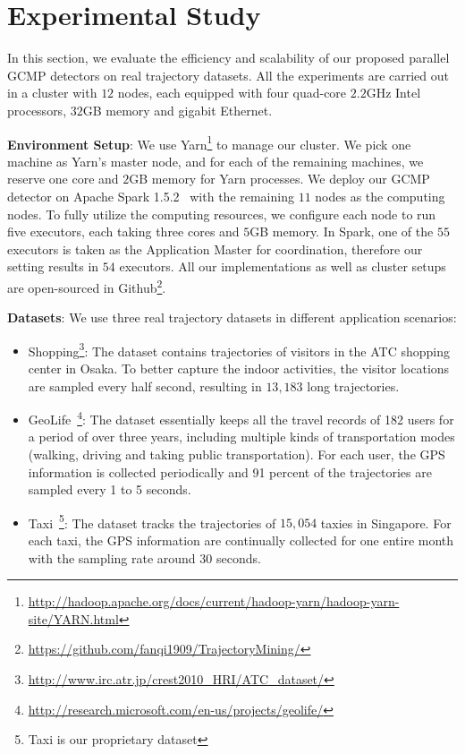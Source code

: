 \section{Experimental Study}
\label{sec:exp}
In this section, we evaluate the efficiency and scalability of our proposed parallel GCMP detectors on real trajectory datasets. All the experiments are carried out in a cluster with $12$ nodes, each equipped with four quad-core $2.2$GHz Intel processors, $32$GB memory and gigabit Ethernet. 

\textbf{Environment Setup}: We use Yarn\footnote{\url{http://hadoop.apache.org/docs/current/hadoop-yarn/hadoop-yarn-site/YARN.html}} to manage our cluster. We pick one machine as Yarn's master node, and for each of the remaining machines, we reserve one core and $2$GB memory for Yarn processes. We deploy our GCMP detector on Apache Spark 1.5.2~\cite{zaharia2012resilient} with the remaining $11$ nodes as the computing nodes.
To fully utilize the computing resources, we configure each node to run five executors, each taking three cores and $5$GB memory. In Spark, one of the $55$ executors is taken as the Application Master for coordination, therefore our setting results in $54$ executors. 
All our implementations as well as cluster setups are open-sourced in Github\footnote{\url{https://github.com/fanqi1909/TrajectoryMining/}}.

\textbf{Datasets}: We use three real trajectory datasets in different application scenarios:
\begin{itemize}
\item{Shopping}\footnote{\url{http://www.irc.atr.jp/crest2010_HRI/ATC_dataset/}}: The dataset contains
  trajectories of visitors in the ATC shopping center in Osaka. To better capture the indoor activities, the visitor locations are sampled every half second, resulting in $13,183$ long trajectories. 
\item{GeoLife}~\footnote{\url{http://research.microsoft.com/en-us/projects/geolife/}}: The dataset essentially keeps all the travel records of 182 users for a period
of over three years, including multiple kinds of transportation modes (walking, driving and taking public
transportation). For each user, the GPS information is collected periodically and 91 percent of the trajectories
are sampled every 1 to 5 seconds.
\item{Taxi}~\footnote{Taxi is our proprietary dataset}: The dataset tracks the trajectories of $15,054$ taxies in Singapore. For each taxi, the GPS information are continually collected for one entire month with the sampling rate around 30 seconds.
\end{itemize}


